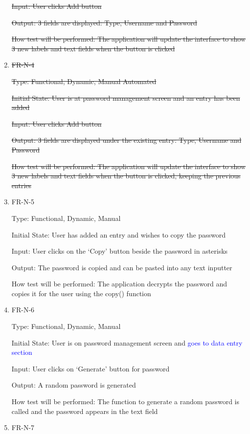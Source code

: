 \documentclass[12pt, titlepage]{article}
\begin{document}
\begin{enumerate}
\sout{Input: User clicks Add button}

\sout{Output: 3 fields are displayed: Type, Username and Password}

\sout{How test will be performed: The application will update the interface to show 3 new labels and text fields when the button is clicked}

\item{\sout{FR-N-4}\\}

\sout{Type: Functional, Dynamic, \sout{Manual} Automated}

\sout{Initial State: User is at password management screen and an entry has been added}

\sout{Input: User clicks Add button}

\sout{Output: 3 fields are displayed under the existing entry: Type, Username and Password}

\sout{How test will be performed: The application will update the interface to show 3 new labels and text fields when the button is clicked, keeping the previous entries}

\item{FR-N-5\\}

Type: Functional, Dynamic, Manual

Initial State: User has added an entry and wishes to copy the password

Input: User clicks on the ‘Copy’ button beside the password in asterisks

Output: The password is copied and can be pasted into any text inputter

How test will be performed: The application decrypts the password and copies it for the user using the copy() function

\item{FR-N-6\\}

Type: Functional, Dynamic, Manual

Initial State: User is on password management screen and \textcolor{blue}{goes to data entry section}

Input: User clicks on ‘Generate’ button for password

Output: A random password is generated

How test will be performed: The function to generate a random password is called and the password appears in the text field

\item{FR-N-7\\}


\end{enumerate}
\end{document}
